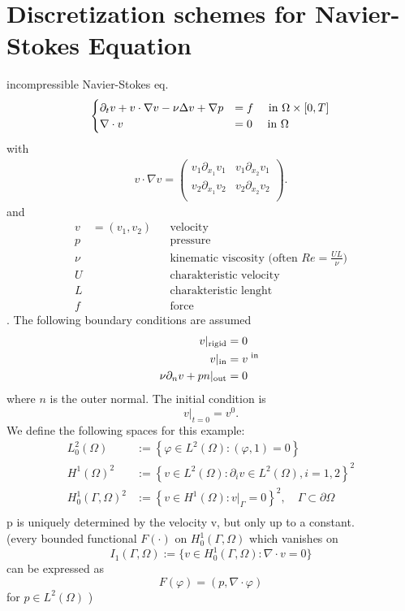 \section{Discretization schemes for Navier-Stokes Equation}
incompressible Navier-Stokes eq.
\begin{align*}
	\begin{cases}
	\partial_t v + v \cdot \nabla v - \nu \Delta v + \nabla p &= f \quad \text{ in } \Omega \times [0,T]\\
	\nabla \cdot v &=0 \quad \text{ in } \Omega 
	\end{cases}
\end{align*}
with 
\begin{align*}
	v \cdot \nabla v  =
	\begin{pmatrix}
	v_1 \partial_{x_1}v_1& v_1\partial_{x_2}v_1\\
	v_2 \partial_{x_1}v_2& v_2\partial_{x_2}v_2\\
	\end{pmatrix}.
\end{align*}
and 
\begin{align*}
	v &= (v_1,v_2) && \text{velocity}\\
	p&&& \text{pressure}\\
	\nu &&& \text{kinematic viscosity (often } Re = \frac{UL}{\nu})\\
	U && &\text{charakteristic velocity}\\
	L && &\text{charakteristic lenght}\\
	f && &\text{force }
\end{align*}.
The following boundary conditions are assumed
\begin{align*}
	v|_{\text{rigid}} &= 0\\
	v|_{\text{in}} &= v^{\text{ in }}\\
	\nu \partial_nv+ pn|_{\text{out}} &=0\\
\end{align*}
where $n$ is the outer normal. The initial condition is
\begin{equation*}
	v|_{t=0}=v^0.
\end{equation*}
We define the following spaces for this example:
\begin{align*}
	L^2_0(\Omega) &:= \left \{ \varphi \in L^2(\Omega)\colon (\varphi,1)=0  \right\}\\
	H^1(\Omega)^2 &:= \left \{ v \in L^2(\Omega)\colon \partial_i v \in L^2(\Omega), i=1,2  \right\}^2\\
	H^1_0(\Gamma,\Omega)^2 &:= \left \{ v \in H^1(\Omega)\colon v|_\Gamma =0 \right\}^2, \quad \Gamma \subset \partial \Omega\\
\end{align*}
p is uniquely determined by the velocity v, but only up to a constant.\\
(every bounded functional $F(\cdot)$ on $H^1_0(\Gamma,\Omega)$ which vanishes on 
\begin{equation*}
	I_1(\Gamma,\Omega) := \{v \in H^1_0(\Gamma,\Omega)\colon \nabla\cdot v =0 \}
\end{equation*}
can be expressed as 
\begin{equation*}
	F(\varphi) = (p, \nabla \cdot \varphi)
\end{equation*}
for $p \in L^2(\Omega)$ )\\
